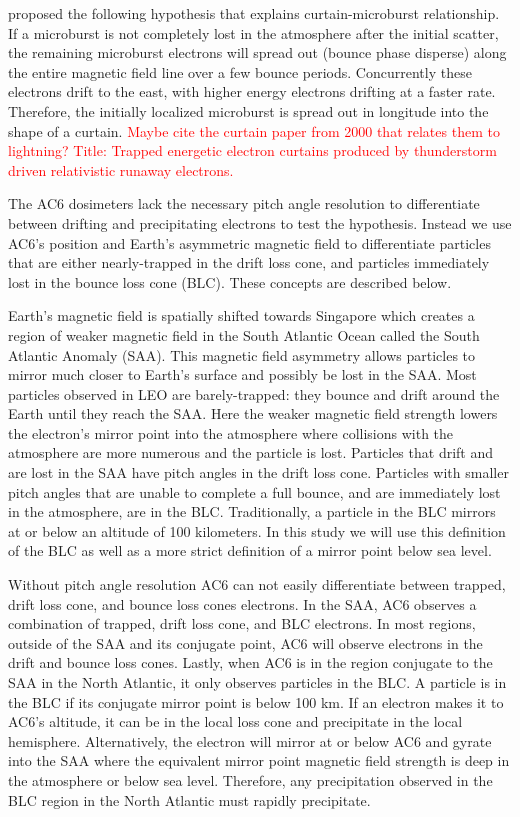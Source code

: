 \documentclass[draft]{agujournal2019}
\begin{document}
 proposed the following hypothesis that explains curtain-microburst relationship. If a microburst is not completely lost in the atmosphere after the initial scatter, the remaining microburst electrons will spread out (bounce phase disperse) along the entire magnetic field line over a few bounce periods. Concurrently these electrons drift to the east, with higher energy electrons drifting at a faster rate. Therefore, the initially localized microburst is spread out in longitude into the shape of a curtain. \textcolor{red}{Maybe cite the curtain paper from 2000 that relates them to lightning? Title: Trapped energetic electron curtains produced by thunderstorm driven relativistic runaway electrons.}

The AC6 dosimeters lack the necessary pitch angle resolution to differentiate between drifting and precipitating electrons to test the  hypothesis. Instead we use AC6's position and Earth's asymmetric magnetic field to differentiate particles that are either nearly-trapped in the drift loss cone, and particles immediately lost in the bounce loss cone (BLC). These concepts are described below.

Earth's magnetic field is spatially shifted towards Singapore which creates a region of weaker magnetic field in the South Atlantic Ocean called the South Atlantic Anomaly (SAA). This magnetic field asymmetry allows particles to mirror much closer to Earth's surface and possibly be lost in the SAA. Most particles observed in LEO are barely-trapped: they bounce and drift around the Earth until they reach the SAA. Here the weaker magnetic field strength lowers the electron's mirror point into the atmosphere where collisions with the atmosphere are more numerous and the particle is lost. Particles that drift and are lost in the SAA have pitch angles in the drift loss cone. Particles with smaller pitch angles that are unable to complete a full bounce, and are immediately lost in the atmosphere, are in the BLC. Traditionally, a particle in the BLC mirrors at or below an altitude of 100 kilometers. In this study we will use this definition of the BLC as well as a more strict definition of a mirror point below sea level.

Without pitch angle resolution AC6 can not easily differentiate between trapped, drift loss cone, and bounce loss cones electrons. In the SAA, AC6 observes a combination of trapped, drift loss cone, and BLC electrons. In most regions, outside of the SAA and its conjugate point, AC6 will observe electrons in the drift and bounce loss cones. Lastly, when AC6 is in the region conjugate to the SAA in the North Atlantic, it only observes particles in the BLC. A particle is in the BLC if its conjugate mirror point is below 100 km. If an electron makes it to AC6's altitude, it can be in the local loss cone and precipitate in the local hemisphere. Alternatively, the electron will mirror at or below AC6 and gyrate into the SAA where the equivalent mirror point magnetic field strength is deep in the atmosphere or below sea level. Therefore, any precipitation observed in the BLC region in the North Atlantic must rapidly precipitate.
\end{document}
